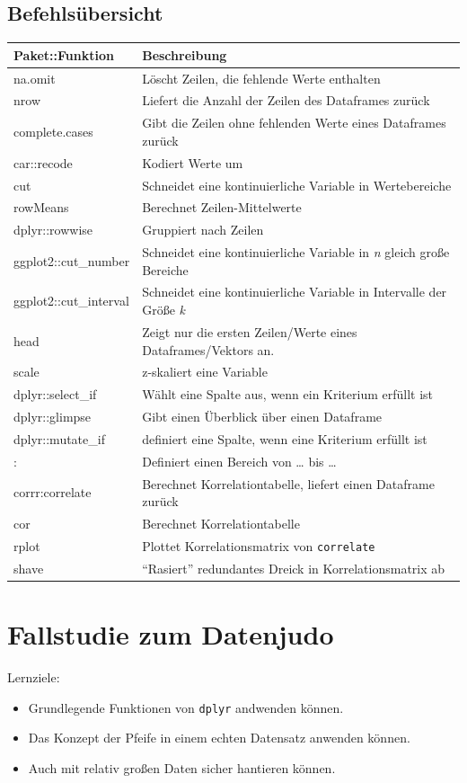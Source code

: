 \documentclass[12pt,ngerman,]{book}
\providecommand{\tightlist}{%
  \setlength{\itemsep}{0pt}\setlength{\parskip}{0pt}}
\let\BeginKnitrBlock\begin \let\EndKnitrBlock\end
\begin{document}
\section{Befehlsübersicht}\label{befehlsubersicht-3}

\begin{longtable}[]{@{}ll@{}}
\toprule
Paket::Funktion & Beschreibung\tabularnewline
\midrule
\endhead
na.omit & Löscht Zeilen, die fehlende Werte enthalten\tabularnewline
nrow & Liefert die Anzahl der Zeilen des Dataframes
zurück\tabularnewline
complete.cases & Gibt die Zeilen ohne fehlenden Werte eines Dataframes
zurück\tabularnewline
car::recode & Kodiert Werte um\tabularnewline
cut & Schneidet eine kontinuierliche Variable in
Wertebereiche\tabularnewline
rowMeans & Berechnet Zeilen-Mittelwerte\tabularnewline
dplyr::rowwise & Gruppiert nach Zeilen\tabularnewline
ggplot2::cut\_number & Schneidet eine kontinuierliche Variable in
\emph{n} gleich große Bereiche\tabularnewline
ggplot2::cut\_interval & Schneidet eine kontinuierliche Variable in
Intervalle der Größe \emph{k}\tabularnewline
head & Zeigt nur die ersten Zeilen/Werte eines Dataframes/Vektors
an.\tabularnewline
scale & z-skaliert eine Variable\tabularnewline
dplyr::select\_if & Wählt eine Spalte aus, wenn ein Kriterium erfüllt
ist\tabularnewline
dplyr::glimpse & Gibt einen Überblick über einen
Dataframe\tabularnewline
dplyr::mutate\_if & definiert eine Spalte, wenn eine Kriterium erfüllt
ist\tabularnewline
: & Definiert einen Bereich von \ldots{} bis \ldots{}\tabularnewline
corrr:correlate & Berechnet Korrelationtabelle, liefert einen Dataframe
zurück\tabularnewline
cor & Berechnet Korrelationtabelle\tabularnewline
rplot & Plottet Korrelationsmatrix von \texttt{correlate}\tabularnewline
shave & ``Rasiert'' redundantes Dreick in Korrelationsmatrix
ab\tabularnewline
\bottomrule
\end{longtable}

\chapter{Fallstudie zum Datenjudo}\label{fallstudie-zum-datenjudo}

\BeginKnitrBlock{rmdcaution}
Lernziele:

\begin{itemize}
\tightlist
\item
  Grundlegende Funktionen von \texttt{dplyr} andwenden können.
\item
  Das Konzept der Pfeife in einem echten Datensatz anwenden können.
\item
  Auch mit relativ großen Daten sicher hantieren können.
\end{itemize}
\EndKnitrBlock{rmdcaution}
\end{document}
